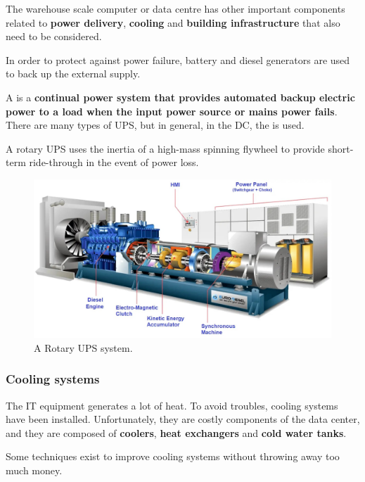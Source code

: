 \noindent
The warehouse scale computer or data centre has other important components related to \textbf{power delivery}, \textbf{cooling} and \textbf{building infrastructure} that also need to be considered.

\highspace
In order to protect against power failure, battery and diesel generators are used to back up the external supply.

\highspace
A  is a \textbf{continual power system that provides automated backup electric power to a load when the input power source or mains power fails}. There are many types of UPS, but in general, in the DC, the  is used.

\highspace
A rotary UPS uses the inertia of a high-mass spinning flywheel to provide short-term ride-through in the event of power loss.

\begin{figure}
	\centering
	\includegraphics[width=\linewidth]{img/components-dc-2.png}
	\caption{A Rotary UPS system.}
\end{figure}

\newpage

\subsubsection{Cooling systems}

The IT equipment generates a lot of heat. To avoid troubles, cooling systems have been installed. Unfortunately, they are costly components of the data center, and they are composed of \textbf{coolers}, \textbf{heat exchangers} and \textbf{cold water tanks}.

\highspace
Some techniques exist to improve cooling systems without throwing away too much money.

